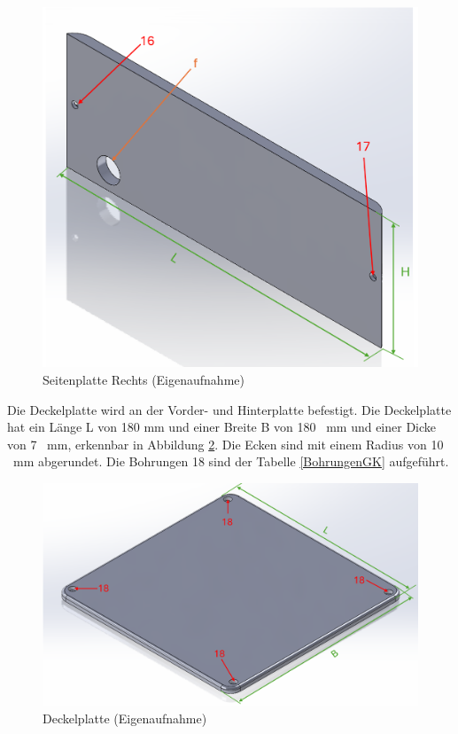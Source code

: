 \begin{figure}[H]
	\begin{center}
		\includegraphics[width=\textwidth]{Images/Konstruktion/SeiteRK.png}
		\caption{Seitenplatte Rechts (Eigenaufnahme)} \label{SeiteRK}
	\end{center}
\end{figure}

Die Deckelplatte wird an der Vorder- und Hinterplatte befestigt. Die Deckelplatte hat ein Länge L von 180 mm und einer Breite B von 180 \ mm und einer Dicke von 7 \ mm, erkennbar in Abbildung \ref{DeckelK}. Die Ecken sind mit einem Radius von 10 \ mm abgerundet. Die Bohrungen 18 sind der Tabelle \ref{BohrungenGK} aufgeführt.

	\begin{figure}[H]
		\begin{center}
			\includegraphics[width=\textwidth]{Images/Konstruktion/DeckelK.png}
			\caption{Deckelplatte (Eigenaufnahme)} \label{DeckelK}
		\end{center}
	\end{figure}
	

